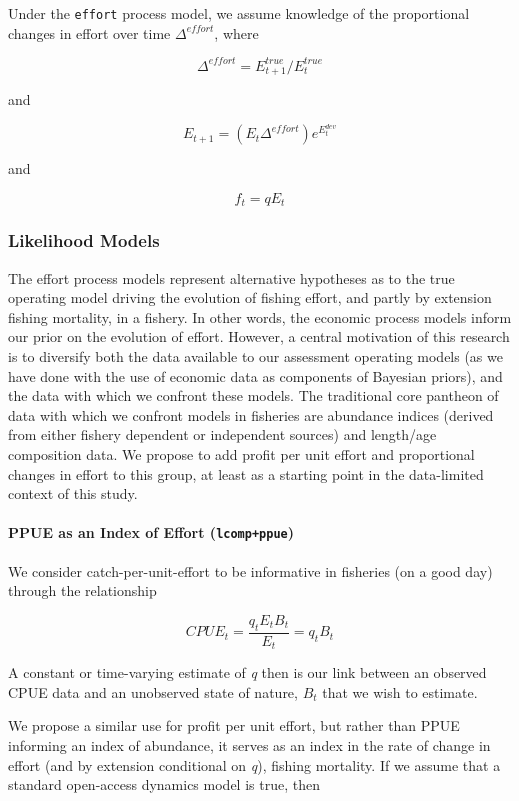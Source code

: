 \documentclass[twoside,12pt,final]{ucthesis-CA2012}
\begin{document}
\begin{ucmainmatter}
Under the \texttt{effort} process model, we assume knowledge of the
proportional changes in effort over time \(\Delta^{effort}\), where

\[\Delta^{effort} = E_{t+1}^{true}/E_{t}^{true}\]

and

\[E_{t + 1} = (E_{t}\Delta^{effort})e^{E^{dev}_{t}}\]

and

\[f_{t} = qE_{t}\]

\subsubsection{Likelihood Models}\label{likelihood-models}

The effort process models represent alternative hypotheses as to the
true operating model driving the evolution of fishing effort, and partly
by extension fishing mortality, in a fishery. In other words, the
economic process models inform our prior on the evolution of effort.
However, a central motivation of this research is to diversify both the
data available to our assessment operating models (as we have done with
the use of economic data as components of Bayesian priors), and the data
with which we confront these models. The traditional core pantheon of
data with which we confront models in fisheries are abundance indices
(derived from either fishery dependent or independent sources) and
length/age composition data. We propose to add profit per unit effort
and proportional changes in effort to this group, at least as a starting
point in the data-limited context of this study.

\paragraph{\texorpdfstring{PPUE as an Index of Effort
(\texttt{lcomp+ppue})}{PPUE as an Index of Effort (lcomp+ppue)}}\label{ppue-as-an-index-of-effort-lcompppue}

We consider catch-per-unit-effort to be informative in fisheries (on a
good day) through the relationship

\[CPUE_{t} = \frac{q_{t}E_tB_t}{E_t} = q_tB_t\]

A constant or time-varying estimate of \emph{q} then is our link between
an observed CPUE data and an unobserved state of nature, \(B_t\) that we
wish to estimate.

We propose a similar use for profit per unit effort, but rather than
PPUE informing an index of abundance, it serves as an index in the rate
of change in effort (and by extension conditional on \emph{q}), fishing
mortality. If we assume that a standard open-access dynamics model is
true, then


\end{ucmainmatter}
\end{document}

